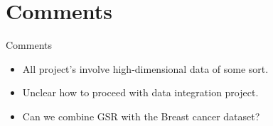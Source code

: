 \documentclass{beamer}
\begin{document}
\section{Comments}
\begin{frame}{Comments}
\begin{itemize}
    \itemsep1em
    \item All project's involve high-dimensional data of some sort.
    \item Unclear how to proceed with data integration project.
    \item Can we combine GSR with the Breast cancer dataset?
\end{itemize}
\end{frame}
\end{document}
